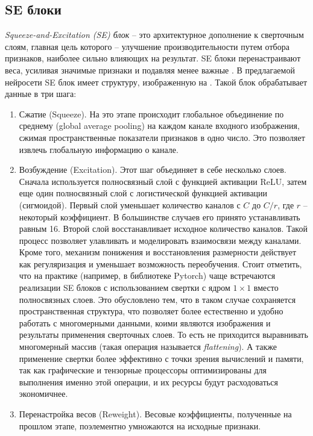 \subsection{SE блоки}
\textit{Squeeze-and-Excitation (SE) блок} -- это архитектурное дополнение к сверточным слоям, главная цель которого -- улучшение производительности путем отбора признаков, наиболее сильно влияющих на результат. SE блоки перенастраивают веса, усиливая значимые признаки и подавляя менее важные \cite{squeeze}. В предлагаемой нейросети SE блок имеет структуру, изображенную на . Такой блок обрабатывает данные в три шага:
\begin{enumerate}[1.]
	\item Сжатие (Squeeze). На это этапе происходит глобальное объединение по среднему (global average pooling) на каждом канале входного изображения, сжимая пространственные показатели признаков в одно число. Это позволяет извлечь глобальную информацию о канале.
	
	\item Возбуждение (Excitation). Этот шаг объединяет в себе несколько слоев. Сначала используется полносвязный слой с функцией активации ReLU, затем еще один полносвязный слой с логистической функцией активации (сигмоидой). Первый слой уменьшает количество каналов с $C$ до $C/r$, где $r$ -- некоторый коэффициент. В большинстве случаев его принято устанавливать равным 16. Второй слой восстанавливает исходное количество каналов. Такой процесс позволяет улавливать и моделировать взаимосвязи между каналами. Кроме того, механизм понижения и восстановления размерности действует как регуляризация и уменьшает возможность переобучения. Стоит отметить, что на практике (например, в библиотеке Pytorch) чаще встречаются реализации SE блоков с использованием свертки с ядром $1 \times 1$ вместо полносвязных слоев. Это обусловлено тем, что в таком случае сохраняется пространственная структура, что позволяет более естественно и удобно работать с многомерными данными, коими являются изображения и результаты применения сверточных слоев. То есть не приходится выравнивать многомерный массив (такая операция называется \textit{flattening}). А также применение свертки более эффективно с точки зрения вычислений и памяти, так как графические и тензорные процессоры оптимизированы для выполнения именно этой операции, и их ресурсы будут расходоваться экономичнее.
	
	\item Перенастройка весов (Reweight). Весовые коэффициенты, полученные на прошлом этапе, поэлементно умножаются на исходные признаки.
\end{enumerate}


